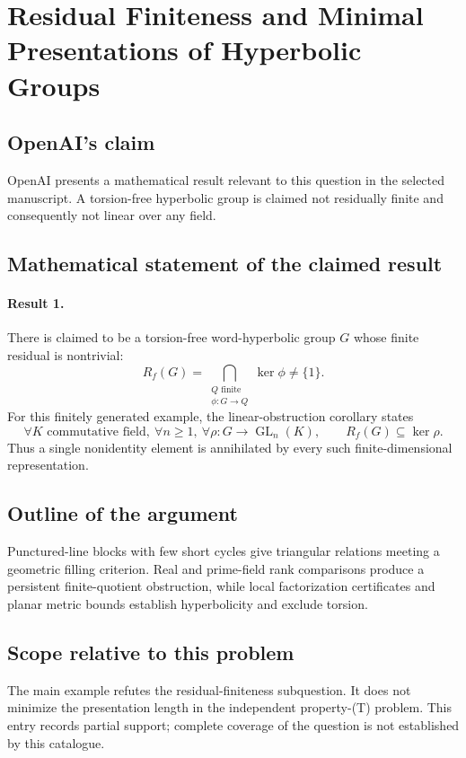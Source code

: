 \documentclass[11pt]{article}
\begin{document}
\section*{Residual Finiteness and Minimal Presentations of Hyperbolic Groups}

\subsection{OpenAI's claim}
OpenAI presents a mathematical result relevant to this question in the selected manuscript. A torsion-free hyperbolic group is claimed not residually finite and consequently not linear over any field.

\subsection{Mathematical statement of the claimed result}
\paragraph{Result 1.} There is claimed to be a torsion-free word-hyperbolic group \(G\) whose finite residual is nontrivial:
\[
 R_f(G)=\bigcap_{\substack{Q\text{ finite}\\\phi:G\to Q}}\ker\phi\ne\{1\}.
\]
For this finitely generated example, the linear-obstruction corollary states
\[
 \forall K\text{ commutative field},\ \forall n\ge1,\ \forall\rho:G\to\operatorname{GL}_n(K),\qquad
 R_f(G)\subseteq\ker\rho.
\]
Thus a single nonidentity element is annihilated by every such finite-dimensional representation.

\subsection{Outline of the argument}
Punctured-line blocks with few short cycles give triangular relations meeting a geometric filling criterion. Real and prime-field rank comparisons produce a persistent finite-quotient obstruction, while local factorization certificates and planar metric bounds establish hyperbolicity and exclude torsion.

\subsection{Scope relative to this problem}
The main example refutes the residual-finiteness subquestion. It does not minimize the presentation length in the independent property-(T) problem. This entry records partial support; complete coverage of the question is not established by this catalogue.
\end{document}
